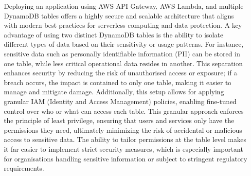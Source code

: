 Deploying an application using AWS API Gateway, AWS Lambda, and multiple DynamoDB tables offers a highly secure and scalable architecture that aligns with modern best practices for serverless computing and data protection. A key advantage of using two distinct DynamoDB tables is the ability to isolate different types of data based on their sensitivity or usage patterns. For instance, sensitive data such as personally identifiable information (PII) can be stored in one table, while less critical operational data resides in another. This separation enhances security by reducing the risk of unauthorised access or exposure; if a breach occurs, the impact is contained to only one table, making it easier to manage and mitigate damage. Additionally, this setup allows for applying granular IAM (Identity and Access Management) policies, enabling fine-tuned control over who or what can access each table. This granular approach enforces the principle of least privilege, ensuring that users and services only have the permissions they need, ultimately minimizing the risk of accidental or malicious access to sensitive data. The ability to tailor permissions at the table level makes it far easier to implement strict security measures, which is especially important for organisations handling sensitive information or subject to stringent regulatory requirements.



